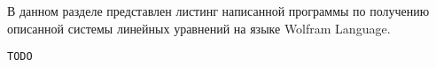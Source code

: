 \documentclass[../main.tex]{subfiles}
\begin{document}
В данном разделе представлен листинг написанной программы по получению описанной системы линейных уравнений на языке Wolfram Language.

\begin{lstlisting}
TODO
\end{lstlisting}
\end{document}
